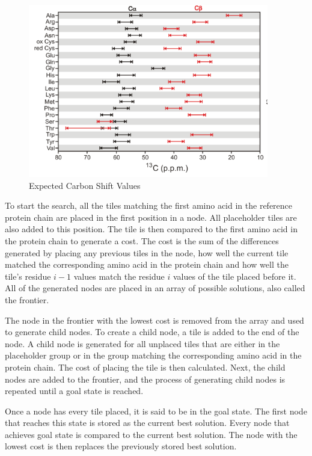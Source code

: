 \documentclass[12pt, letter]{article}
\begin{document}
\begin{figure}[H]
\begin{center}
\includegraphics{carbon}
\end{center}
\caption{Expected Carbon Shift Values \cite{carbon}} %
\label{fig:carbon}
\end{figure}

To start the search,  all the tiles matching the first amino acid in the reference protein chain are placed in the first position in a node. All placeholder tiles are also added to this position. The tile is then compared to the first amino acid in the protein chain to generate a cost. The cost is the sum of the differences generated by placing any previous tiles in the node, how well the current tile matched the corresponding amino acid in the protein chain and how well the tile's residue $i-1$ values match the residue $i$ values of the tile placed before it. All of the generated nodes are placed in an array of possible solutions, also called the frontier. 

The node in the frontier with the lowest cost is removed from the array and used to generate child nodes. To create a child node, a tile is added to the end of the node. A child node is generated for all unplaced tiles that are either in the placeholder group or in the group matching the corresponding amino acid in the protein chain. The cost of placing the tile is then calculated.  Next, the child nodes are added to the frontier, and the process of generating child nodes is repeated until a goal state is reached. 

Once a node has every tile placed, it is said to be in the goal state. The first node that reaches this state is stored as the current best solution. Every node that achieves goal state is compared to the current best solution. The node with the lowest cost is then replaces the previously stored best solution. 
\end{document}
